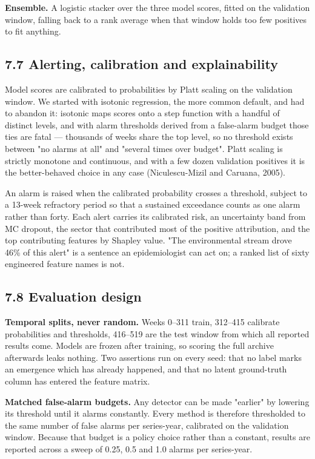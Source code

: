\documentclass[11pt,a4paper]{article}
\begin{document}
\textbf{Ensemble.} A logistic stacker over the three model scores, fitted on the validation window, falling back to a rank average when that window holds too few positives to fit anything.

\subsection*{7.7 Alerting, calibration and explainability}

Model scores are calibrated to probabilities by Platt scaling on the validation window. We started with isotonic regression, the more common default, and had to abandon it: isotonic maps scores onto a step function with a handful of distinct levels, and with alarm thresholds derived from a false-alarm budget those ties are fatal — thousands of weeks share the top level, so no threshold exists between "no alarms at all" and "several times over budget". Platt scaling is strictly monotone and continuous, and with a few dozen validation positives it is the better-behaved choice in any case (Niculescu-Mizil and Caruana, 2005).

An alarm is raised when the calibrated probability crosses a threshold, subject to a 13-week refractory period so that a sustained exceedance counts as one alarm rather than forty. Each alert carries its calibrated risk, an uncertainty band from MC dropout, the sector that contributed most of the positive attribution, and the top contributing features by Shapley value. "The environmental stream drove 46\% of this alert" is a sentence an epidemiologist can act on; a ranked list of sixty engineered feature names is not.

\subsection*{7.8 Evaluation design}

\textbf{Temporal splits, never random.} Weeks 0–311 train, 312–415 calibrate probabilities and thresholds, 416–519 are the test window from which all reported results come. Models are frozen after training, so scoring the full archive afterwards leaks nothing. Two assertions run on every seed: that no label marks an emergence which has already happened, and that no latent ground-truth column has entered the feature matrix.

\textbf{Matched false-alarm budgets.} Any detector can be made "earlier" by lowering its threshold until it alarms constantly. Every method is therefore thresholded to the same number of false alarms per series-year, calibrated on the validation window. Because that budget is a policy choice rather than a constant, results are reported across a sweep of 0.25, 0.5 and 1.0 alarms per series-year.
\end{document}
